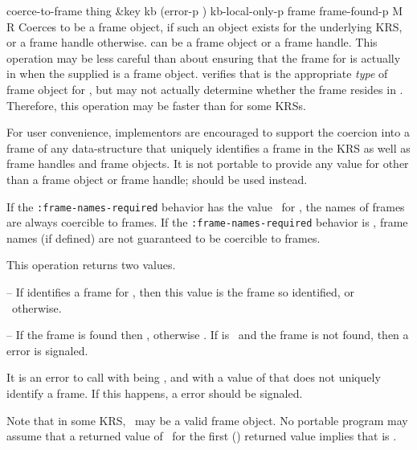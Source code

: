 \begin{okbcop}{coerce-to-frame}{ thing \&key kb (error-p \true) kb-local-only-p} { frame frame-found-p } { M } { R } {  }
Coerces  to be a frame object, if such an object exists for
   the underlying KRS, or a frame handle otherwise.   can be a
   frame object or a frame handle.  This operation may be
   less careful than  about ensuring that the
   frame for  is actually in  when the supplied
    is a frame object.   verifies that
    is the
   appropriate {\it type} of frame object for , but may not
   actually determine whether the frame resides in .  Therefore, this
   operation may be faster than  for some KRSs.

   For user convenience, implementors are encouraged to support the coercion
   into a frame of any data-structure that uniquely identifies a frame in
   the KRS as well as frame handles and frame objects.  It is not
   portable to provide any value for  other than a frame
   object or frame handle;  should be used instead.

   If the {\tt :frame-names-required} behavior has the value \true\ for
   , the names of frames are always coercible to frames.
   If the {\tt :frame-names-required} behavior is \false, frame names
   (if defined) are not guaranteed to be coercible to frames.

   This operation returns two values.
   \bitem
   \item {} -- If  identifies a frame for ,
                           then this value is the frame so identified, or
                           \false\ otherwise.
   \item {} -- If the frame is found then \true,
                                   otherwise \false.
   \eitem
   If  is \true\ and the frame is not found, then a
    error is signaled.

   It is an error to call  with  being
   \true, and with a value of  that does not uniquely identify
   a frame.  If this happens, a  error should be
   signaled.

   Note that in some KRS, \false\ may be a valid frame object.  No portable
   program may assume that a returned value of \false\ for the first
   () returned value implies that  is
   \false.
\end{okbcop}

